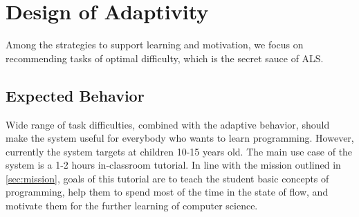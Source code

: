 \chapter{Design of Adaptivity}
\label{chap:design-of-adaptivity}


Among the strategies to support learning and motivation,
we focus on recommending tasks of optimal difficulty,
which is the secret sauce of ALS. %


\section{Expected Behavior}  %
\label{sec:robomission.behavior}



Wide range of task difficulties, combined with the adaptive behavior,
should make the system useful for everybody who wants to learn programming.
However, %
currently the system targets at children 10-15 years old.
The main use case of the system is a 1-2 hours in-classroom tutorial.
In line with the mission outlined in \cref{sec:mission}, goals of this tutorial
are to teach the student basic concepts of programming,
help them to spend most of the time in the state of flow,
and motivate them for the further learning of computer science.

